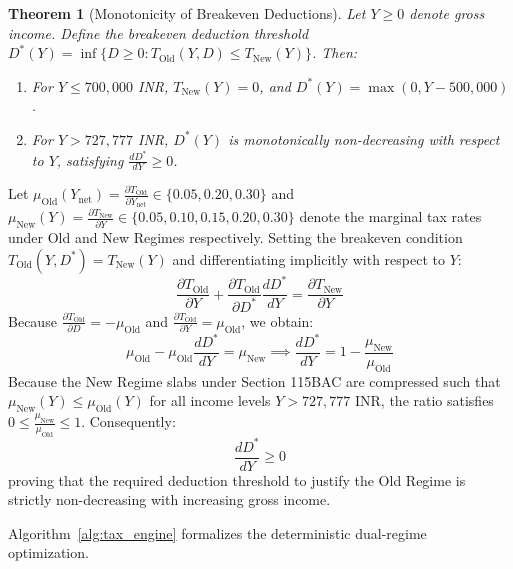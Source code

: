\documentclass[conference]{IEEEtran}
\newtheorem{theorem}{Theorem}
\begin{document}
\begin{theorem}[Monotonicity of Breakeven Deductions]
\label{thm:breakeven}
Let $Y \ge 0$ denote gross income. Define the breakeven deduction threshold $D^*(Y) = \inf \{ D \ge 0 : T_{\text{Old}}(Y, D) \le T_{\text{New}}(Y) \}$. Then:
\begin{enumerate}
    \item For $Y \le 700,000$ INR, $T_{\text{New}}(Y) = 0$, and $D^*(Y) = \max(0, Y - 500,000)$.
    \item For $Y > 727,777$ INR, $D^*(Y)$ is monotonically non-decreasing with respect to $Y$, satisfying $\frac{d D^*}{d Y} \ge 0$.
\end{enumerate}
\end{theorem}

\begin{IEEEproof}
Let $\mu_{\text{Old}}(Y_{\text{net}}) = \frac{\partial T_{\text{Old}}}{\partial Y_{\text{net}}} \in \{0.05, 0.20, 0.30\}$ and $\mu_{\text{New}}(Y) = \frac{\partial T_{\text{New}}}{\partial Y} \in \{0.05, 0.10, 0.15, 0.20, 0.30\}$ denote the marginal tax rates under Old and New Regimes respectively.
Setting the breakeven condition $T_{\text{Old}}(Y, D^*) = T_{\text{New}}(Y)$ and differentiating implicitly with respect to $Y$:
\begin{equation}
\frac{\partial T_{\text{Old}}}{\partial Y} + \frac{\partial T_{\text{Old}}}{\partial D^*} \frac{d D^*}{d Y} = \frac{\partial T_{\text{New}}}{\partial Y}
\end{equation}
Because $\frac{\partial T_{\text{Old}}}{\partial D} = -\mu_{\text{Old}}$ and $\frac{\partial T_{\text{Old}}}{\partial Y} = \mu_{\text{Old}}$, we obtain:
\begin{equation}
\mu_{\text{Old}} - \mu_{\text{Old}} \frac{d D^*}{d Y} = \mu_{\text{New}} \implies \frac{d D^*}{d Y} = 1 - \frac{\mu_{\text{New}}}{\mu_{\text{Old}}}
\end{equation}
Because the New Regime slabs under Section 115BAC are compressed such that $\mu_{\text{New}}(Y) \le \mu_{\text{Old}}(Y)$ for all income levels $Y > 727,777$ INR, the ratio satisfies $0 \le \frac{\mu_{\text{New}}}{\mu_{\text{Old}}} \le 1$. Consequently:
\begin{equation}
\frac{d D^*}{d Y} \ge 0
\end{equation}
proving that the required deduction threshold to justify the Old Regime is strictly non-decreasing with increasing gross income.
\end{IEEEproof}

Algorithm~\ref{alg:tax_engine} formalizes the deterministic dual-regime optimization.
\end{document}
